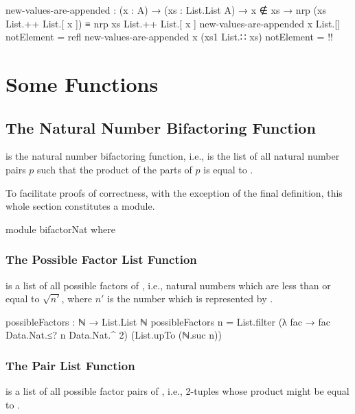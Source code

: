 \documentclass{report}
\begin{document}
\begin{code}
  new-values-are-appended :
    (x : A) →
    (xs : List.List A) →
    x ∉ xs →
    nrp (xs List.++ List.[ x ]) ≡ nrp xs List.++ List.[ x ]
  new-values-are-appended x List.[] notElement = refl
  new-values-are-appended x (xs1 List.∷ xs) notElement = {!!}
\end{code}

\chapter{Some Functions}

\section{The Natural Number Bifactoring Function}
 is the natural number bifactoring function, i.e.,   is the list of all natural number pairs \(p\) such that the product of the parts of \(p\) is equal to .

To facilitate proofs of correctness, with the exception of the final definition, this whole section constitutes a module.

\begin{code}
module bifactorNat where
\end{code}

\subsection{The Possible Factor List Function}
  is a list of all possible factors of , i.e., natural numbers which are less than or equal to \(\sqrt{n\prime}\), where \(n\prime\) is the number which is represented by .

\begin{code}
  possibleFactors : ℕ → List.List ℕ
  possibleFactors n = List.filter (λ fac → fac Data.Nat.≤? n Data.Nat.^ 2)
                                  (List.upTo (ℕ.suc n))
\end{code}

\subsection{The Pair List Function}
  is a list of all possible factor pairs of , i.e., 2-tuples whose product might be equal to .
\end{document}
